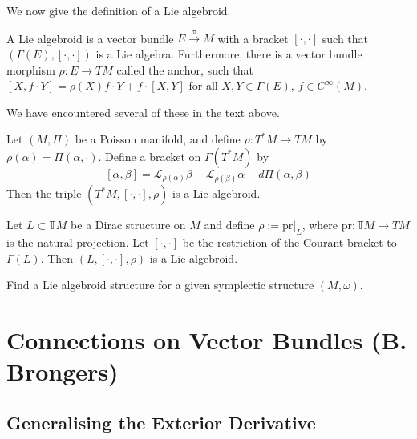 We now give the definition of a Lie algebroid.
\begin{definition}
  A Lie algebroid is a vector bundle $E\xrightarrow{\pi}M$ with a bracket $[\cdot,\cdot]$ such that $(\Gamma(E),[\cdot,\cdot])$ is a Lie algebra. Furthermore, there is a vector bundle morphism $\rho:E\to TM$ called the anchor, such that $[X,f\cdot Y]=\rho(X)f\cdot Y+f\cdot[X,Y]$ for all $X,Y\in\Gamma(E)$, $f\in C^\infty(M)$.
\end{definition}
We have encountered several of these in the text above.
\begin{example}
  Let $(M,\Pi)$ be a Poisson manifold, and define $\rho:T^*M\to TM$ by $\rho(\alpha)=\Pi(\alpha,\cdot)$. Define a bracket on $\Gamma(T^*M)$ by $$[\alpha,\beta]=\mathcal{L}_{\rho(\alpha)}\beta-\mathcal{L}_{\rho(\beta)}\alpha-d\Pi(\alpha,\beta)$$
  Then the triple $(T^*M,[\cdot,\cdot],\rho)$ is a Lie algebroid.
\end{example}
\begin{example}
  Let $L\subset\mathbb{T}M$ be a Dirac structure on $M$ and define $\rho:=\text{pr}|_L$, where $\text{pr}:\mathbb{T}M\to TM$ is the natural projection. Let $[\cdot,\cdot]$ be the restriction of the Courant bracket to $\Gamma(L)$. Then $(L,[\cdot,\cdot],\rho)$ is a Lie algebroid.
\end{example}
\begin{exercise}
  Find a Lie algebroid structure for a given symplectic structure $(M,\omega)$.
\end{exercise}

\chapter{Connections on Vector Bundles (B. Brongers)}

\section{Generalising the Exterior Derivative}

